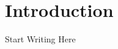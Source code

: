 \documentclass{article}[a4paper,12pt]
\begin{document}
  \maketitle %
  \newpage %
  \tableofcontents

\section{Introduction}
Start Writing Here

\end{document}
